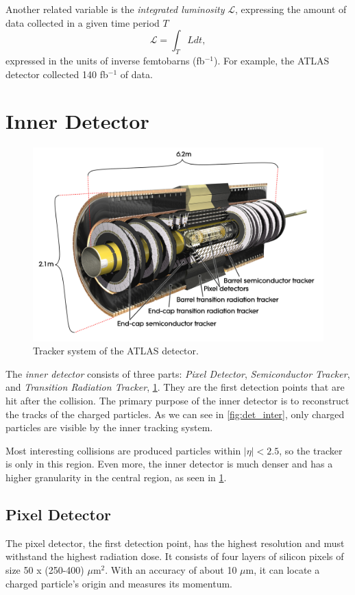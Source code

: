 Another related variable is the \emph{integrated luminosity} $ \mathcal{L}$, expressing the amount of data collected in a given time period $T$
\begin{equation}
    \mathcal{L} = \int_{T} L dt,
\end{equation}
expressed in the units of inverse femtobarns (fb$^{-1}$).
For example, the ATLAS detector collected 140 fb$^{-1}$ of data.




\section{Inner Detector}
\label{sec:trackers}
\begin{figure}[htb]
    \centering
    \includegraphics[width=1\linewidth]{src/img/track.jpg}
    \caption{Tracker system of the ATLAS detector.}
    \label{fig:tracker}
\end{figure}
The \emph{inner detector} consists of three parts: \emph{Pixel Detector}, \emph{Semiconductor Tracker}, and \emph{Transition Radiation Tracker}, \cref{fig:tracker}. 
They are the first detection points that are hit after the collision.
The primary purpose of the inner detector is to reconstruct the tracks of the charged particles.
As we can see in \cref{fig:det_inter}, only charged particles are visible by the inner tracking system.

Most interesting collisions are produced particles within $|\eta| < 2.5$, so the tracker is only in this region.
Even more, the inner detector is much denser and has a higher granularity in the central region, as seen in \cref{fig:tracker}.

\subsection{Pixel Detector}
The pixel detector, the first detection point, has the highest resolution and must withstand the highest radiation dose.
It consists of four layers of silicon pixels of size 50 x (250-400) $\mu$m$^2$.
With an accuracy of about 10 $\mu$m, it can locate a charged particle's origin and measures its momentum.

